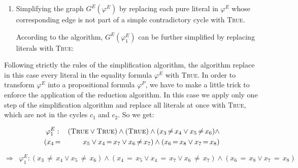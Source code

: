 {\begin{enumerate}
%

The equality graph has two contradictory cycles, $%
c_{1}=(x_{6},x_{8},x_{7},x_{6})$ and $%
c_{2}=(x_{4},x_{5},x_{6},x_{8},x_{7},x_{4})$.

\item Simplifying the graph $G^{E}(\varphi ^{E})$ by replacing each pure
literal in $\varphi ^{E}$ whose corresponding edge is not part of a simple
contradictory cycle with \textsc{True}.

According to the algorithm, $G^{E}(\varphi _{1}^{E})$ can be further
simplified by replacing literals with \textsc{True}:
\bigskip
\end{enumerate}

Following strictly the rules of the simplification algorithm, the algorithm
replace in this case every literal in the equality formula $\varphi ^{E}$
with \textsc{True}. In order to transform $\varphi ^{E}$ into a
propositional formula $\varphi ^{P}$, we have to make a little trick to
enforce the application of the reduction algorithm. In this case we apply
only one step of the simplification algorithm and replace all literals at
once with \textsc{True}, which are not in the cycles $c_{1}$ and $c_{2}$. So
we get:

\begin{eqnarray*}
\varphi _{1}^{E} &:&(\text{\textsc{True}}\vee \text{\textsc{True}})\wedge (%
\text{\textsc{True}})\wedge (x_{3}\,{\neq }\,x_{4}\vee x_{5}\,{\neq }%
\,x_{6})\wedge \\
(x_{4}\, &{=}&\,x_{5}\vee x_{4}\,{=}\,x_{7}\vee x_{6}\,{\neq }\,x_{7})\wedge
(x_{6}\,{=}\,x_{8}\vee x_{7}\,{=}\,x_{8})
\end{eqnarray*}

\begin{equation*}
\Rightarrow \;\;\varphi _{1}^{E}:(x_{3}\,{\neq }\,x_{4}\vee x_{5}\,{\neq }%
\,x_{6})\wedge (x_{4}\,{=}\,x_{5}\vee x_{4}\,{=}\,x_{7}\vee x_{6}\,{\neq }%
\,x_{7})\wedge (x_{6}\,{=}\,x_{8}\vee x_{7}\,{=}\,x_{8})
\end{equation*}

}
